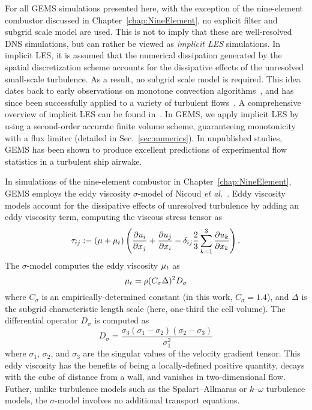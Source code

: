 For all GEMS simulations presented here, with the exception of the nine-element combustor discussed in Chapter~\ref{chap:NineElement}, no explicit filter and subgrid scale model are used. This is not to imply that these are well-resolved DNS simulations, but can rather be viewed as \textit{implicit LES} simulations. In implicit LES, it is assumed that the numerical dissipation generated by the spatial discretization scheme accounts for the dissipative effects of the unresolved small-scale turbulence. As a result, no subgrid scale model is required. This idea dates back to early observations on monotone convection algorithms~\cite{Boris1989}, and has since been successfully applied to a variety of turbulent flows~\cite{Porter1994,Grinstein2005,Bensow2010}. A comprehensive overview of implicit LES can be found in~\cite{ilesBook}. In GEMS, we apply implicit LES by using a second-order accurate finite volume scheme, guaranteeing monotonicity with a flux limiter (detailed in Sec.~\ref{sec:numerics}). In unpublished studies, GEMS has been shown to produce excellent predictions of experimental flow statistics in a turbulent ship airwake.

In simulations of the nine-element combustor in Chapter~\ref{chap:NineElement}, GEMS employs the eddy viscosity $\sigma$-model of Nicoud \textit{et al.}~\cite{Nicoud2011}. Eddy viscosity models account for the dissipative effects of unresolved turbulence by adding an eddy viscosity term, computing the viscous stress tensor as
%
\begin{equation}
	\tau_{i j} := \left(\mu + \mu_{t}\right) \left( \frac{\partial u_{i}}{\partial x_{j}} + \frac{\partial u_{j}}{\partial x_{i}} - \delta_{i j} \frac{2}{3} \sum_{k=1}^3 \frac{\partial u_{k}}{\partial x_{k}} \right).
\end{equation}
%
The $\sigma$-model computes the eddy viscosity $\mu_{t}$ as
%
\begin{equation}
	\mu_{t} = \rho (C_{\sigma} \Delta)^2 D_{\sigma}
\end{equation}
%
where $C_{\sigma}$ is an empirically-determined constant (in this work, $C_{\sigma} = 1.4$), and $\Delta$ is the subgrid characteristic length scale (here, one-third the cell volume). The differential operator $D_{\sigma}$ is computed as
%
\begin{equation}
	D_{\sigma} = \frac{\sigma_3\left(\sigma_1 - \sigma_2\right)\left(\sigma_2 - \sigma_3\right)}{\sigma_1^2}
\end{equation}
%
where $\sigma_1$, $\sigma_2$, and $\sigma_3$ are the singular values of the velocity gradient tensor. This eddy viscosity has the benefits of being a locally-defined positive quantity, decays with the cube of distance from a wall, and vanishes in two-dimensional flow. Futher, unlike turbulence models such as the Spalart--Allmaras or $k$--$\omega$ turbulence models, the $\sigma$-model involves no additional transport equations.


